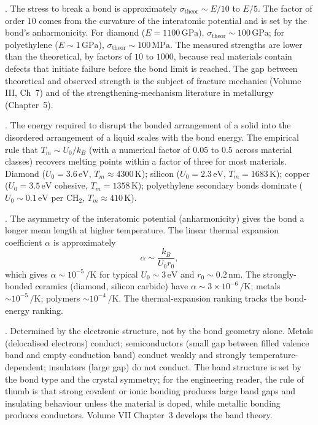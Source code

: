 . The stress to break a bond is
approximately $\sigma_{\text{theor}} \sim E/10$ to $E/5$. The
factor of order $10$ comes from the curvature of the interatomic
potential and is set by the bond's anharmonicity. For diamond
($E = 1100\,\text{GPa}$), $\sigma_{\text{theor}} \sim 100\,\text{GPa}$;
for polyethylene ($E \sim 1\,\text{GPa}$), $\sigma_{\text{theor}} \sim
100\,\text{MPa}$. The measured strengths are lower than the
theoretical, by factors of $10$ to $1000$, because real materials
contain defects that initiate failure before the bond limit is
reached. The gap between theoretical and observed strength is the
subject of fracture mechanics (Volume III, Ch~7) and of the
strengthening-mechanism literature in metallurgy (Chapter~5).

. The energy required to disrupt the bonded
arrangement of a solid into the disordered arrangement of a liquid
scales with the bond energy. The empirical rule that $T_m \sim
U_0/k_B$ (with a numerical factor of $0.05$ to $0.5$ across material
classes) recovers melting points within a factor of three for most
materials. Diamond ($U_0 = 3.6\,\text{eV}$, $T_m \approx 4300\,
\si{\kelvin}$); silicon ($U_0 = 2.3\,\text{eV}$, $T_m = 1683\,
\si{\kelvin}$); copper ($U_0 = 3.5\,\text{eV}$ cohesive, $T_m = 1358\,
\si{\kelvin}$); polyethylene secondary bonds dominate ($U_0 \sim 0.1\,
\text{eV}$ per CH$_2$, $T_m \approx 410\,\si{\kelvin}$).

. The asymmetry of the interatomic
potential (anharmonicity) gives the bond a longer mean length at
higher temperature. The linear thermal expansion coefficient $\alpha$
is approximately
\[
\alpha \sim \frac{k_B}{U_0 r_0},
\]
which gives $\alpha \sim 10^{-5}\,/\si{\kelvin}$ for typical
$U_0 \sim 3\,\text{eV}$ and $r_0 \sim 0.2\,\text{nm}$. The strongly-
bonded ceramics (diamond, silicon carbide) have $\alpha \sim 3 \times
10^{-6}\,/\si{\kelvin}$; metals $\sim 10^{-5}\,/\si{\kelvin}$;
polymers $\sim 10^{-4}\,/\si{\kelvin}$. The thermal-expansion ranking
tracks the bond-energy ranking.

. Determined by the electronic
structure, not by the bond geometry alone. Metals (delocalised
electrons) conduct; semiconductors (small gap between filled valence
band and empty conduction band) conduct weakly and strongly
temperature-dependent; insulators (large gap) do not conduct. The
band structure is set by the bond type and the crystal symmetry; for
the engineering reader, the rule of thumb is that strong covalent or
ionic bonding produces large band gaps and insulating behaviour
unless the material is doped, while metallic bonding produces
conductors. Volume VII Chapter~3 develops the band theory.


